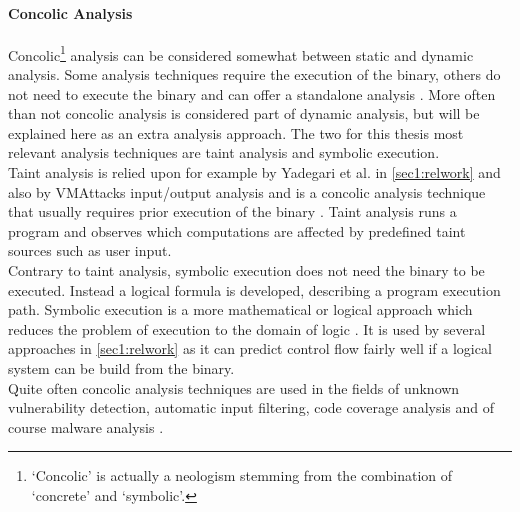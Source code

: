 \documentclass[10pt,twoside,a4paper,bibliography=totoc]{scrbook}
\begin{document}
\paragraph*{Concolic Analysis}
Concolic\footnote{`Concolic' is actually a neologism stemming from the combination of `concrete' and `symbolic'. } analysis can be considered somewhat between static and dynamic analysis. Some analysis techniques require the execution of the binary, others do not need to execute the binary and can offer a standalone analysis \cite{taint}.
More often than not concolic analysis is considered part of dynamic analysis, but will be explained here as an extra analysis approach. 
The two for this thesis most relevant analysis techniques are taint analysis and symbolic execution.\\
Taint analysis is relied upon for example by Yadegari et al. in \ref{sec1:relwork} and also by VMAttacks input/output analysis and is a concolic analysis technique that usually requires prior execution of the binary \cite{DBLP:conf/sp/YadegariJWD15, taint}.
Taint analysis runs a program and observes which computations are affected by predefined taint sources such as user input.\\
Contrary to taint analysis, symbolic execution does not need the binary to be executed. Instead a logical formula is developed, describing a program execution path. 
Symbolic execution is a more mathematical or logical approach which reduces the problem of execution to the domain of logic \cite{taint}.
It is used by several approaches in \ref{sec1:relwork} as it can predict control flow fairly well if a logical system can be build from the binary.\\
Quite often concolic analysis techniques are used in the fields of unknown vulnerability detection, automatic input filtering, code coverage analysis and of course malware analysis \cite{taint}.
\end{document}
